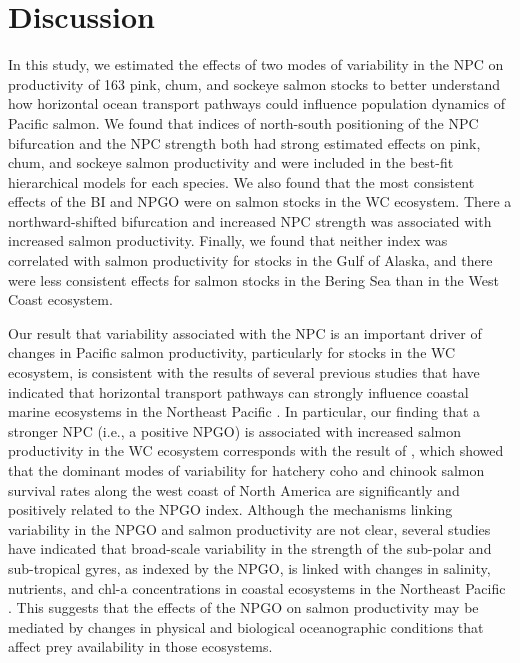 \section{Discussion}

In this study, we estimated the effects of two modes of variability in the NPC
on productivity of 163 pink, chum, and sockeye salmon stocks to better
understand how horizontal ocean transport pathways could influence population
dynamics of Pacific salmon. We found that indices of north-south positioning of
the NPC bifurcation and the NPC strength both had strong estimated effects on
pink, chum, and sockeye salmon productivity and were included in the best-fit
hierarchical models for each species. We also found that the most consistent
effects of the BI and NPGO were on salmon stocks in the WC ecosystem. There a
northward-shifted bifurcation and increased NPC strength was associated with
increased salmon productivity. Finally, we found that neither index was
correlated with salmon productivity for stocks in the Gulf of Alaska, and there
were less consistent effects for salmon stocks in the Bering Sea than in the
West Coast ecosystem.

Our result that variability associated with the NPC is an important driver of
changes in Pacific salmon productivity, particularly for stocks in the WC
ecosystem, is consistent with the results of several previous studies that have
indicated that horizontal transport pathways can strongly influence coastal
marine ecosystems in the Northeast Pacific \citep{Kilduff2015, Sydeman2011a,
Batten2007a}. In particular, our finding that a stronger NPC (i.e., a positive
NPGO) is associated with increased salmon productivity in the WC ecosystem
corresponds with the result of \citet{Kilduff2015}, which showed that the
dominant modes of variability for hatchery coho and chinook salmon survival
rates along the west coast of North America are significantly and positively
related to the NPGO index. Although the mechanisms linking variability in the
NPGO and salmon productivity are not clear, several studies have indicated that
broad-scale variability in the strength of the sub-polar and sub-tropical gyres,
as indexed by the NPGO, is linked with changes in salinity, nutrients, and chl-a
concentrations in coastal ecosystems in the Northeast Pacific
\citep{Di-Lorenzo2008a, Chenillat2012}. This suggests that the effects of the
NPGO on salmon productivity may be mediated by changes in physical and
biological oceanographic conditions that affect prey availability in those
ecosystems.

